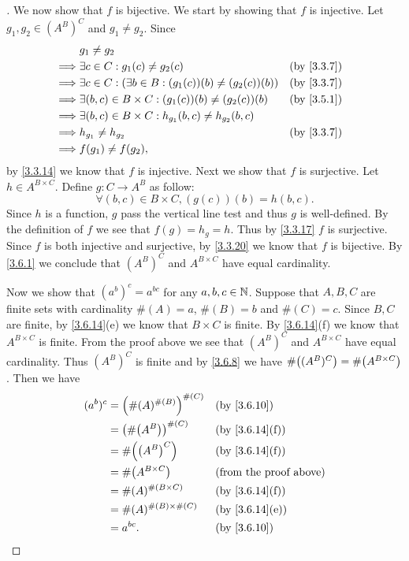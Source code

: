 \begin{proof}[]
	We now show that \(f\) is bijective.
	We start by showing that \(f\) is injective.
	Let \(g_1, g_2 \in (A^B)^C\) and \(g_1 \neq g_2\).
	Since
	\begin{align*}
		         & g_1 \neq g_2                                                                       \\
		\implies & \exists c \in C : g_1(c) \neq g_2(c)                               &  & \by{3.3.7} \\
		\implies & \exists c \in C : (\exists b \in B : (g_1(c))(b) \neq (g_2(c))(b)) &  & \by{3.3.7} \\
		\implies & \exists (b, c) \in B \times C : (g_1(c))(b) \neq (g_2(c))(b)       &  & \by{3.5.1} \\
		\implies & \exists (b, c) \in B \times C : h_{g_1}(b, c) \neq h_{g_2}(b, c)                   \\
		\implies & h_{g_1} \neq h_{g_2}                                               &  & \by{3.3.7} \\
		\implies & f(g_1) \neq f(g_2),
	\end{align*}
	by \cref{3.3.14} we know that \(f\) is injective.
	Next we show that \(f\) is surjective.
	Let \(h \in A^{B \times C}\).
	Define \(g : C \to A^B\) as follow:
	\[
		\forall (b, c) \in B \times C, (g(c))(b) = h(b, c).
	\]
	Since \(h\) is a function, \(g\) pass the vertical line test and thus \(g\) is well-defined.
	By the definition of \(f\) we see that \(f(g) = h_g = h\).
	Thus by \cref{3.3.17} \(f\) is surjective.
	Since \(f\) is both injective and surjective, by \cref{3.3.20} we know that \(f\) is bijective.
	By \cref{3.6.1} we conclude that \((A^B)^C\) and \(A^{B \times C}\) have equal cardinality.

	Now we show that \((a^b)^c = a^{bc}\) for any \(a, b, c \in \mathbb{N}\).
	Suppose that \(A, B, C\) are finite sets with cardinality \(\#(A) = a\), \(\#(B) = b\) and \(\#(C) = c\).
	Since \(B, C\) are finite, by \cref{3.6.14}(e) we know that \(B \times C\) is finite.
	By \cref{3.6.14}(f) we know that \(A^{B \times C}\) is finite.
	From the proof above we see that \((A^B)^C\) and \(A^{B \times C}\) have equal cardinality.
	Thus \((A^B)^C\) is finite and by \cref{3.6.8} we have \(\#\pa{(A^B)^C} = \#\pa{A^{B \times C}}\).
	Then we have
	\begin{align*}
		(a^b)^c & = \pa{\#(A)^{\#(B)}}^{\#(C)} &  & \by{3.6.10}                   \\
		        & = \pa{\#\pa{A^B}}^{\#(C)}    &  & \by{3.6.14}[f]                \\
		        & = \#\pa{\pa{A^B}^C}          &  & \by{3.6.14}[f]                \\
		        & = \#\pa{A^{B \times C}}      &  & \text{(from the proof above)} \\
		        & = \#(A)^{\#(B \times C)}     &  & \by{3.6.14}[f]                \\
		        & = \#(A)^{\#(B) \times \#(C)} &  & \by{3.6.14}[e]                \\
		        & = a^{bc}.                    &  & \by{3.6.10}
	\end{align*}


\end{proof}
